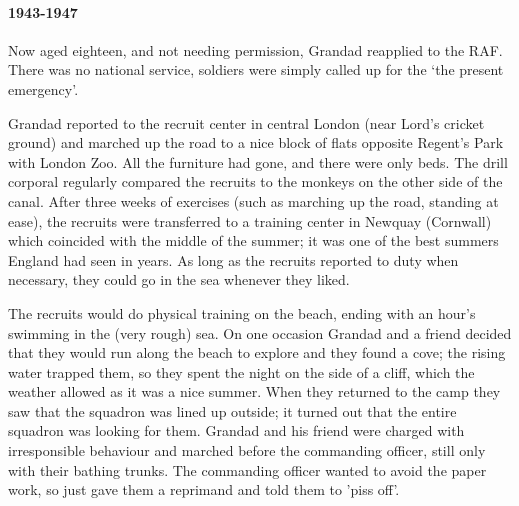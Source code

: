 \paragraph{1943-1947} Now aged eighteen, and not needing permission, Grandad reapplied to the RAF.
There was no national service, soldiers were simply called up for the `the present
emergency'.
\begin{figure}
	\centering
\end{figure}
Grandad reported to the recruit center in central London (near Lord's cricket ground) and
marched up the road to a nice block of flats opposite Regent's Park with London Zoo.
All the furniture had gone, and there were only beds.
The drill corporal regularly compared the recruits to the monkeys on the other side of the canal.
After three weeks of exercises (such as marching up the road, standing at ease), the recruits were transferred to a training
center in Newquay (Cornwall) which coincided with the middle of the summer; it was
one of the best summers England had seen in years. As long as the recruits reported to duty when necessary,
they could go in the sea whenever they liked.

The recruits would do physical training on the beach, ending with an hour's swimming in the (very rough) sea.
On one occasion Grandad and a friend decided that they would run along the beach to explore and they found a
cove; the rising water trapped them,  so they spent the night on the side of a cliff, which the
weather allowed as it was a nice summer.  When they returned to the camp they saw that the squadron was lined up outside;
it turned out that the entire squadron was looking for them. Grandad and his friend
were charged with irresponsible behaviour and marched before the commanding officer, still
only with their bathing trunks. The commanding officer wanted to avoid the paper work, so just
gave them a reprimand and told them to 'piss off'.

